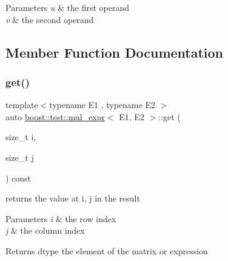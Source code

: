 \begin{DoxyParams}{Parameters}
{\em u} & the first operand \\
\hline
{\em v} & the second operand \\
\hline
\end{DoxyParams}


\subsection{Member Function Documentation}
\mbox{\label{classboost_1_1test_1_1mul__expr_aa0befa96e7967b7c81c6ae724e81bb93}} 
\subsubsection{\texorpdfstring{get()}{get()}}
{\footnotesize\ttfamily template$<$typename E1 , typename E2 $>$ \\
auto \mbox{\hyperlink{classboost_1_1test_1_1mul__expr}{boost\+::test\+::mul\+\_\+expr}}$<$ E1, E2 $>$\+::get (\begin{DoxyParamCaption}\item[{size\+\_\+t}]{i,  }\item[{size\+\_\+t}]{j }\end{DoxyParamCaption}) const\hspace{0.3cm}{\ttfamily [inline]}}



returns the value at i, j in the result 


\begin{DoxyParams}{Parameters}
{\em i} & the row index \\
\hline
{\em j} & the column index \\
\hline
\end{DoxyParams}
\begin{DoxyReturn}{Returns}
dtype the element of the matrix or expression 
\end{DoxyReturn}
\mbox{\label{classboost_1_1test_1_1mul__expr_a2bdebb65cd38018d5cbd5c829ebf3dae}} 
